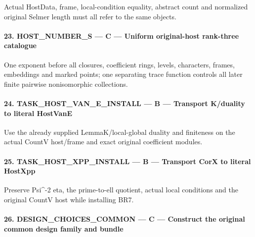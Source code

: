 \documentclass[11pt,a4paper]{article}
\numberwithin{equation}{section}
\theoremstyle{remark}\newtheorem{remark}[theorem]{Remark}
\begin{document}
Actual HostData, frame, local-condition equality, abstract count and normalized original Selmer length must all refer to the same objects.


\paragraph{23. HOST\_\allowbreak{}NUMBER\_\allowbreak{}S — C — Uniform original-host rank-three catalogue}

One exponent before all closures, coefficient rings, levels, characters, frames, embeddings and marked points; one separating trace function controls all later finite pairwise nonisomorphic collections.


\paragraph{24. TASK\_\allowbreak{}HOST\_\allowbreak{}VAN\_\allowbreak{}E\_\allowbreak{}INSTALL — B — Transport K/\allowbreak{}duality to literal HostVanE}

Use the already supplied LemmaK/\allowbreak{}local-global duality and finiteness on the actual CountV host/\allowbreak{}frame and exact original coefficient modules.


\paragraph{25. TASK\_\allowbreak{}HOST\_\allowbreak{}XPP\_\allowbreak{}INSTALL — B — Transport CorX to literal HostXpp}

Preserve Psi\textasciicircum{}-2 eta, the prime-to-ell quotient, actual local conditions and the original CountV host while installing BR7.


\paragraph{26. DESIGN\_\allowbreak{}CHOICES\_\allowbreak{}COMMON — C — Construct the original common design family and bundle}
\end{document}
